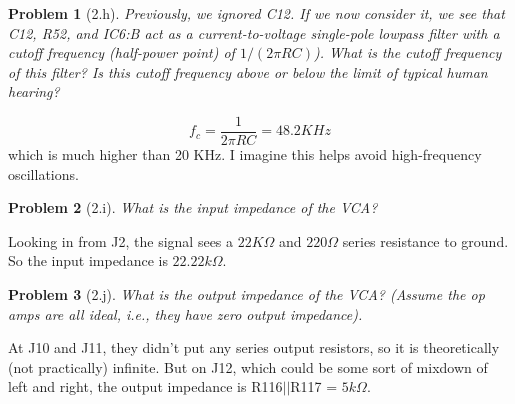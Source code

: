 \documentclass[12pt]{article}
\providecommand{\ohm}[0]{\ensuremath{\Omega}}
\newtheorem*{prob}{Problem}
\begin{document}
\begin{prob}[2.h]{
  Previously, we ignored C12. If we now consider it, we see that C12, R52, and IC6:B act as a current-to-voltage single-pole lowpass filter with a cutoff frequency (half-power point) of $1/(2\pi RC)$). What is the cutoff frequency of this filter? Is this cutoff frequency above or below the limit of typical human hearing?
}\end{prob}
\[f_c = \frac{1}{2\pi RC} = 48.2 KHz\]
which is much higher than 20 KHz. I imagine this helps avoid high-frequency oscillations.

\begin{prob}[2.i]{
  What is the input impedance of the VCA?
}\end{prob}
Looking in from J2, the signal sees a $22K\ohm$ and $220\ohm$ series resistance to ground. So the input impedance is $22.22k\ohm$.

\begin{prob}[2.j]{
  What is the output impedance of the VCA? (Assume the op amps are all ideal, i.e., they have zero output impedance).
}\end{prob}
At J10 and J11, they didn't put any series output resistors, so it is theoretically (not practically) infinite. But on J12, which could be some sort of mixdown of left and right, the output impedance is R116$||$R117 = $5k\ohm$.
\end{document}
